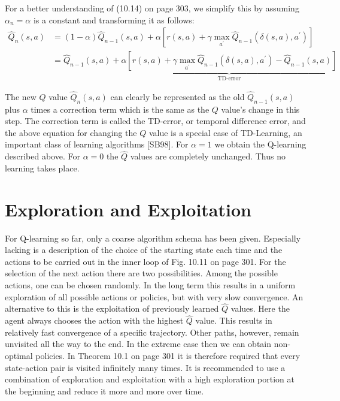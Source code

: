 \documentclass[10pt]{book}
\begin{document}
For a better understanding of (10.14) on page 303, we simplify this by assuming $\alpha_{n}=\alpha$ is a constant and transforming it as follows:
\[
\begin{aligned}
\hat{Q}_{n}(s, a) &=(1-\alpha)\hat{Q}_{n-1}(s, a)+\alpha\left[r(s, a)+\gamma \max_{a^{\prime}} \hat{Q}_{n-1}\left(\delta(s, a), a^{\prime}\right)\right] \\
&=\hat{Q}_{n-1}(s, a)+\underbrace{\alpha\left[r(s, a)+\gamma \max_{a^{\prime}} \hat{Q}_{n-1}\left(\delta(s, a), a^{\prime}\right)-\hat{Q}_{n-1}(s, a)\right]}_{\text{TD-error}}
\end{aligned}
\]

The new $Q$ value $\hat{Q}_{n}(s, a)$ can clearly be represented as the old $\hat{Q}_{n-1}(s, a)$ plus $\alpha$ times a correction term which is the same as the $Q$ value's change in this step. The correction term is called the TD-error, or temporal difference error, and the above equation for changing the $Q$ value is a special case of TD-Learning, an important class of learning algorithms [SB98]. For $\alpha=1$ we obtain the Q-learning described above. For $\alpha=0$ the $\hat{Q}$ values are completely unchanged. Thus no learning takes place.

\section{Exploration and Exploitation}
For Q-learning so far, only a coarse algorithm schema has been given. Especially lacking is a description of the choice of the starting state each time and the actions to be carried out in the inner loop of Fig. 10.11 on page 301. For the selection of the next action there are two possibilities. Among the possible actions, one can be chosen randomly. In the long term this results in a uniform exploration of all possible actions or policies, but with very slow convergence. An alternative to this is the exploitation of previously learned $\hat{Q}$ values. Here the agent always chooses the action with the highest $\hat{Q}$ value. This results in relatively fast convergence of a specific trajectory. Other paths, however, remain unvisited all the way to the end. In the extreme case then we can obtain non-optimal policies. In Theorem 10.1 on page 301 it is therefore required that every state-action pair is visited infinitely many times. It is recommended to use a combination of exploration and exploitation with a high exploration portion at the beginning and reduce it more and more over time.
\end{document}
